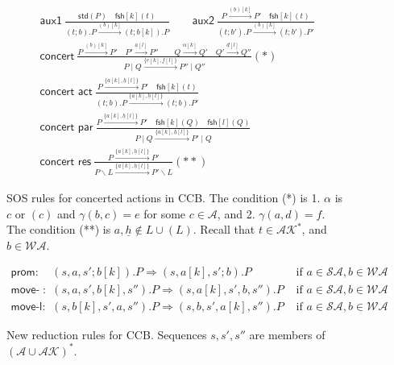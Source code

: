 \documentclass[runningheads]{llncs}
\newcommand{\Rule}[2]{\displaystyle{\frac{#1}{#2}}}
\newcommand{\paral}{\; \vert \;}
\newcommand{\mAK}{\mathcal{AK}}
\newcommand{\std}[1]{\mathsf{std}(#1)}
\newcommand{\fresh}[2]{\mathsf{fsh}[#1](#2)}
\newcommand{\rulename}[1]{\textsf{#1}}
\begin{document}
\begin{figure}
\[
\begin{array}{l}
\rulename{aux1}\ 
\Rule{\std{P} \quad \fresh{k}{t}}
{(t;b).P \xrightarrow{(b)[k]}(t;b[k]).P}
\qquad
\rulename{aux2}\
\Rule
{P \xrightarrow{(b)[k]} P' \quad \fresh{k}{t}}
{(t;b').P \xrightarrow{(b)[k]} (t;b').P'}
\\[25pt]
\rulename{concert}\ 
\Rule
{P\xrightarrow{(b)[k]}P' \quad P'\xrightarrow{\underline{a}[l]}P'' \qquad Q\xrightarrow{\alpha[k]}Q' 
  \quad Q'\xrightarrow{\underline{d}[l]}Q''%
 }
{P \paral Q\xrightarrow{\{e[k],\underline{f}[l]\}} P'' \paral Q''} (*)\\[25pt]
\rulename{concert act}\
\Rule
{P \xrightarrow{\{{a}[k], \underline{h}[l]\}} P' \quad \fresh{k}{t}}
{(t;b).P \xrightarrow{\{{a}[k], \underline{h}[l]\}} (t;b).P'}\\[25pt]
\rulename{concert par}\
\Rule
{P \xrightarrow{\{{a}[k], \underline{h}[l]\}} P'\quad \fresh{k}{Q} \quad \fresh{l}{Q}}
{P \paral Q \xrightarrow{\{{a}[k], \underline{h}[l]\}} P' \paral Q}\\[25pt]
\rulename{concert res}\
\Rule
{P \xrightarrow{\{{a}[k], \underline{h}[l]\}} P'}
{P\backslash L \xrightarrow{\{{a}[k], \underline{h}[l]\}} P'\backslash L} (**)
%
\end{array}
\] 
\caption[SOS rules for concerted actions in CCB.]{SOS rules for concerted actions in CCB. The condition (*) is 1. $\alpha$ is $c$ or $(c)$ 
and $\gamma(b,c)=e$ for some $c\in \mathcal{A}$, and 2. $\gamma(a,d)=f$. 
The condition (**) is $a, \underline{h}  \notin L \cup (L)$. 
Recall that $t \in \mAK^*$, and $b \in \mathcal{WA}$.} \label{fig:csos}
\end{figure}

\begin{figure}
\[
\begin{array}{lll}
\rulename{prom}: & (s,a,s';b[k]).P \Rightarrow (s,a[k],s';b).P & \mbox{ if } a \in \mathcal{SA}, b \in \mathcal{WA} 
\\[10pt]
\rulename{move-r}: & (s,a,s',b[k],s'').P \Rightarrow (s,a[k],s',b,s'').P & \mbox{ if } a \in \mathcal{SA}, b \in \mathcal{WA}
\\[10pt]
\rulename{move-l}: & (s,b[k],s',a,s'').P \Rightarrow (s,b,s',a[k],s'').P & \mbox{ if } a \in \mathcal{SA}, b \in \mathcal{WA}
\end{array}
\] 
\caption[Reduction rules for CCB.]{New reduction rules for CCB. Sequences $s, s', s''$ are members of $(\mathcal{A} \cup \mathcal{AK})^{*}$.} 
\label{fig:reduction}
\end{figure}
\clearpage
\end{document}
